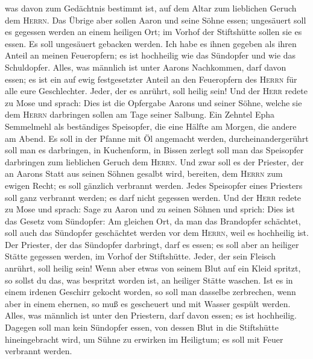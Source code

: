 was davon zum Gedächtnis bestimmt ist, auf dem Altar zum lieblichen
Geruch dem \textsc{Herrn}.  Das Übrige aber sollen Aaron
und seine Söhne essen; ungesäuert soll es gegessen werden an einem
heiligen Ort; im Vorhof der Stiftshütte sollen sie es essen.
 Es soll ungesäuert gebacken werden. Ich habe es ihnen
gegeben als ihren Anteil an meinen Feueropfern; es ist hochheilig wie
das Sündopfer und wie das Schuldopfer.  Alles, was
männlich ist unter Aarons Nachkommen, darf davon essen; es ist ein auf
ewig festgesetzter Anteil an den Feueropfern des \textsc{Herrn} für alle
eure Geschlechter. Jeder, der es anrührt, soll heilig sein!
 Und der \textsc{Herr} redete zu Mose und sprach:
 Dies ist die Opfergabe Aarons und seiner Söhne, welche
sie dem \textsc{Herrn} darbringen sollen am Tage seiner Salbung. Ein
Zehntel Epha Semmelmehl als beständiges Speisopfer, die eine Hälfte am
Morgen, die andere am Abend.  Es soll in der Pfanne mit
Öl angemacht werden, durcheinandergerührt soll man es darbringen, in
Kuchenform, in Bissen zerlegt soll man das Speisopfer darbringen zum
lieblichen Geruch dem \textsc{Herrn}.  Und zwar soll es
der Priester, der an Aarons Statt aus seinen Söhnen gesalbt wird,
bereiten, dem \textsc{Herrn} zum ewigen Recht; es soll gänzlich
verbrannt werden.  Jedes Speisopfer eines Priesters soll
ganz verbrannt werden; es darf nicht gegessen werden. 
Und der \textsc{Herr} redete zu Mose und sprach:  Sage zu
Aaron und zu seinen Söhnen und sprich: Dies ist das Gesetz vom
Sündopfer: Am gleichen Ort, da man das Brandopfer schächtet, soll auch
das Sündopfer geschächtet werden vor dem \textsc{Herrn}, weil es
hochheilig ist.  Der Priester, der das Sündopfer
darbringt, darf es essen; es soll aber an heiliger Stätte gegessen
werden, im Vorhof der Stiftshütte.  Jeder, der sein
Fleisch anrührt, soll heilig sein! Wenn aber etwas von seinem Blut auf
ein Kleid spritzt, so sollst du das, was bespritzt worden ist, an
heiliger Stätte waschen.  Ist es in einem irdenen
Geschirr gekocht worden, so soll man dasselbe zerbrechen, wenn aber in
einem ehernen, so muß es gescheuert und mit Wasser gespült werden.
 Alles, was männlich ist unter den Priestern, darf davon
essen; es ist hochheilig.  Dagegen soll man kein
Sündopfer essen, von dessen Blut in die Stiftshütte hineingebracht wird,
um Sühne zu erwirken im Heiligtum; es soll mit Feuer verbrannt werden.

